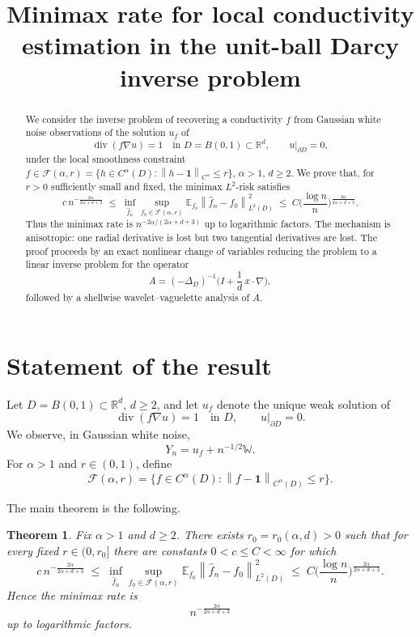 \documentclass[11pt]{article}
\title{Minimax rate for local conductivity estimation in the unit-ball Darcy inverse problem}
\author{}
\date{}
\newtheorem{theorem}{Theorem}
\newcommand{\R}{\mathbb R}
\newcommand{\E}{\mathbb E}
\newcommand{\1}{\mathbf 1}
\newcommand{\Div}{\operatorname{div}}
\newcommand{\norm}[1]{\left\|#1\right\|}
\begin{document}
\maketitle

\begin{abstract}
We consider the inverse problem of recovering a conductivity $f$ from Gaussian white noise observations of the solution $u_f$ of
\[
\Div(f\nabla u)=1 \quad \text{in } D=B(0,1)\subset \R^d,\qquad u|_{\partial D}=0,
\]
under the local smoothness constraint $f\in\mathcal F(\alpha,r)=\{h\in C^\alpha(D):\norm{h-\1}_{C^\alpha}\le r\}$, $\alpha>1$, $d\ge2$. We prove that, for $r>0$ sufficiently small and fixed, the minimax $L^2$-risk satisfies
\[
c\,n^{-\frac{2\alpha}{2\alpha+d+3}}
\;\le\;
\inf_{\hat f_n}\sup_{f_0\in\mathcal F(\alpha,r)}
\E_{f_0}\norm{\hat f_n-f_0}_{L^2(D)}^2
\;\le\;
C\Big(\frac{\log n}{n}\Big)^{\frac{2\alpha}{2\alpha+d+3}}.
\]
Thus the minimax rate is $n^{-2\alpha/(2\alpha+d+3)}$ up to logarithmic factors. The mechanism is anisotropic: one radial derivative is lost but two tangential derivatives are lost. The proof proceeds by an exact nonlinear change of variables reducing the problem to a linear inverse problem for the operator
\[
A=(-\Delta_D)^{-1}\Big(I+\frac1d\,x\cdot\nabla\Big),
\]
followed by a shellwise wavelet--vaguelette analysis of $A$.
\end{abstract}

\section{Statement of the result}

Let $D=B(0,1)\subset\R^d$, $d\ge2$, and let $u_f$ denote the unique weak solution of
\begin{equation}\label{eq:darcy}
\Div(f\nabla u)=1 \quad \text{in }D,\qquad u|_{\partial D}=0.
\end{equation}
We observe, in Gaussian white noise,
\begin{equation}\label{eq:white-noise}
Y_n=u_f+n^{-1/2}\mathbb W.
\end{equation}
For $\alpha>1$ and $r\in(0,1)$, define
\[
\mathcal F(\alpha,r)=\{f\in C^\alpha(D):\norm{f-\1}_{C^\alpha(D)}\le r\}.
\]

The main theorem is the following.

\begin{theorem}\label{thm:main}
Fix $\alpha>1$ and $d\ge2$. There exists $r_0=r_0(\alpha,d)>0$ such that for every fixed $r\in(0,r_0]$ there are constants $0<c\le C<\infty$ for which
\begin{equation}\label{eq:minimax-main}
c\,n^{-\frac{2\alpha}{2\alpha+d+3}}
\;\le\;
\inf_{\hat f_n}\sup_{f_0\in\mathcal F(\alpha,r)}
\E_{f_0}\norm{\hat f_n-f_0}_{L^2(D)}^2
\;\le\;
C\Big(\frac{\log n}{n}\Big)^{\frac{2\alpha}{2\alpha+d+3}}.
\end{equation}
Hence the minimax rate is
\[
n^{-\frac{2\alpha}{2\alpha+d+3}}
\]
up to logarithmic factors.
\end{theorem}
\end{document}
